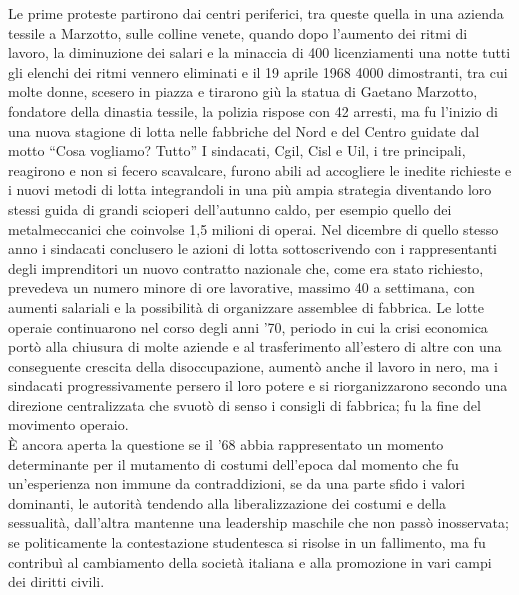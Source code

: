 Le prime proteste partirono dai centri periferici, tra queste quella in una azienda tessile a Marzotto, sulle colline venete, quando dopo l'aumento dei ritmi di lavoro, la diminuzione dei salari e la minaccia di 400 licenziamenti una notte tutti gli elenchi dei ritmi vennero eliminati e il 19 aprile 1968 4000 dimostranti, tra cui molte donne, scesero in piazza e tirarono giù la statua di Gaetano Marzotto, fondatore della dinastia tessile, la polizia rispose con 42 arresti, ma fu l'inizio di una nuova stagione di lotta nelle fabbriche del Nord e del Centro guidate dal motto \enquote{Cosa vogliamo? Tutto}
I sindacati, Cgil, Cisl e Uil, i tre principali, reagirono e non si fecero scavalcare, furono abili ad accogliere le inedite richieste e i nuovi metodi di lotta integrandoli in una più ampia strategia diventando loro stessi guida di grandi scioperi dell'autunno caldo, per esempio quello dei metalmeccanici che coinvolse 1,5 milioni di operai.
Nel dicembre di quello stesso anno i sindacati conclusero le azioni di lotta sottoscrivendo con i rappresentanti degli imprenditori un nuovo contratto nazionale che, come era stato richiesto, prevedeva un numero minore di ore lavorative, massimo 40 a settimana, con aumenti salariali e la possibilità di organizzare assemblee di fabbrica.
Le lotte operaie continuarono nel corso degli anni '70, periodo in cui la crisi economica portò alla chiusura di molte aziende e al trasferimento all'estero di altre con una conseguente crescita della disoccupazione, aumentò anche il lavoro in nero, ma i sindacati progressivamente persero il loro potere e si riorganizzarono secondo una direzione centralizzata che svuotò di senso i consigli di fabbrica; fu la fine del movimento operaio.
\\È ancora aperta la questione se il '68 abbia rappresentato un momento determinante per il mutamento di costumi dell'epoca dal momento che fu un'esperienza non immune da contraddizioni, se da una parte sfido i valori dominanti, le autorità tendendo alla liberalizzazione dei costumi e della sessualità, dall'altra mantenne una leadership maschile che non passò inosservata; se politicamente la contestazione studentesca si risolse in un fallimento, ma fu contribuì al cambiamento della società italiana e alla promozione in vari campi dei diritti civili.


